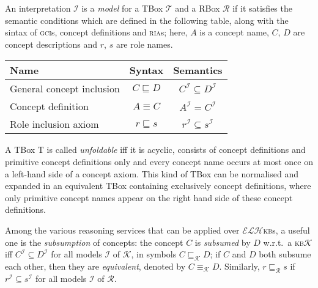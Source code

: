 \documentclass[]{llncs}
\newcommand{\elh}{\(\mathcal{ELH}\)\xspace}
\newcommand{\kb}{\textsc{kb}\xspace}
\newcommand{\ria}{\textsc{ria}\xspace}
\newcommand{\gci}{\textsc{gci}\xspace}
\newcommand{\subsume}[1]{\sqsubseteq_{\mathcal{#1}}}
\begin{document}
  An interpretation \(\mathcal{I}\) is a \emph{model} for a TBox \(\mathcal{T}\) and a RBox \(\mathcal{R}\) if it satisfies the semantic conditions which are defined in the following table, along with the sintax of \gci{}s, concept definitions and \ria{}s; here, \(A\) is a concept name, \(C\), \(D\) are concept descriptions and \(r\), \(s\) are role names.
  \begin{center}
    \begin{tabular}{lcc}
      \toprule
      Name & Syntax & Semantics \\
      \midrule
      General concept inclusion & \(C \sqsubseteq D\) & \(C^\mathcal{I} \subseteq D^\mathcal{I}\) \\
      Concept definition & \(A \equiv C\) & \(A^\mathcal{I} = C^\mathcal{I}\) \\
      Role inclusion axiom & \(r \sqsubseteq s\) & \(r^\mathcal{I} \subseteq s^\mathcal{I}\) \\
      \bottomrule
    \end{tabular}
  \end{center}
  A TBox T is called \emph{unfoldable} iff it is acyclic, consists of concept definitions and primitive concept definitions only and every concept name occurs at most once on a left-hand side of a concept axiom.
  This kind of TBox can be normalised and expanded in an equivalent TBox containing exclusively concept definitions, where only primitive concept names appear on the right hand side of these concept definitions.

  Among the various reasoning services that can be applied over \elh \kb{}s, a useful one is the \emph{subsumption} of concepts: the concept \(C\) is \emph{subsumed} by \(D\) w.r.t.\ a \kb \(\mathcal{K}\) iff \(C^\mathcal{I} \subseteq D^\mathcal{I}\) for all models \(\mathcal{I}\) of \(\mathcal{K}\), in symbols \(C \subsume{K} D\);
  if \(C\) and \(D\) both subsume each other, then they are \emph{equivalent}, denoted by \(C \equiv_{\mathcal{K}} D\).
  Similarly, \(r \subsume{R} s\) if \(r^\mathcal{I} \subseteq s^\mathcal{I}\) for all models \(\mathcal{I}\) of \(\mathcal{R}\).
\end{document}
